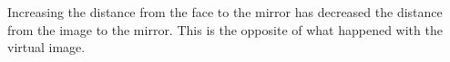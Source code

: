 Increasing the distance from the face to the mirror has decreased the distance
from the image to the mirror. This is the opposite of what happened with the virtual
image.



